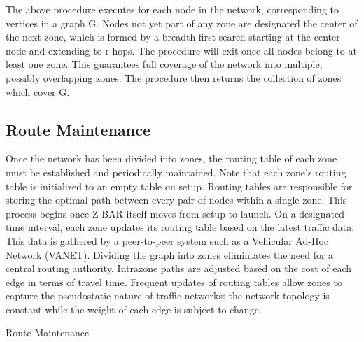 \documentclass[conference]{IEEEtran}
\begin{document}

The above procedure executes for each node in the network, corresponding to vertices in a graph G. Nodes not yet part of any zone are designated the center of the next zone, which is formed by a breadth-first search starting at the center node and extending to r hops. The procedure will exit once all nodes belong to at least one zone. This guarantees full coverage of the network into multiple, possibly overlapping zones. The procedure then returns the collection of zones which cover G.

\subsection{Route Maintenance}


Once the network has been divided into zones, the routing table of each zone must be established and periodically maintained. Note that each zone's routing table is initialized to an empty table on setup. Routing tables are responsible for storing the optimal path between every pair of nodes within a single zone. This process begins once Z-BAR itself moves from setup to launch. On a designated time interval, each zone updates its routing table based on the latest traffic data. This data is gathered by a peer-to-peer system such as a Vehicular Ad-Hoc Network (VANET). Dividing the graph into zones elimintates the need for a central routing authority. Intrazone paths are adjusted based on the cost of each edge in terms of travel time. Frequent updates of routing tables allow zones to capture the pseudostatic nature of traffic networks: the network topology is constant while the weight of each edge is subject to change.

\begin{algorithm}[H]
  \caption{Route Maintenance}
  \label{route_maintenance}
  \begin{algorithmic}[1]
  \EndFor
  \EndProcedure
  \end{algorithmic}
\end{algorithm}
\end{document}
